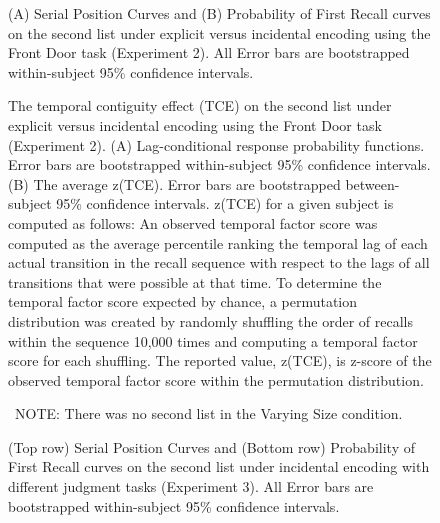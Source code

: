 \documentclass[man,natbib,floatsintext]{apa6} %
\begin{document}
\newcommand\spcpaneltext{All Error bars are bootstrapped within-subject 95\% confidence intervals.}


\newcommand\paneltext{(A) Lag-conditional response probability functions. Error bars are bootstrapped within-subject 95\% confidence intervals. (B) The average z(TCE).  Error bars are bootstrapped between-subject 95\% confidence intervals. z(TCE) for a given subject is computed as follows: An observed temporal factor score was computed as the average percentile ranking the temporal lag of each actual transition in the recall sequence with respect to the lags of all transitions that were possible at that time. To determine the temporal factor score expected by chance, a permutation distribution was created by randomly shuffling the order of recalls within the sequence 10,000 times and computing a temporal factor score for each shuffling. The reported value, z(TCE), is z-score of the observed temporal factor score within the permutation distribution.}

\begin{figure}
\caption{(A) Serial Position Curves and (B) Probability of First Recall curves on the second list under explicit versus incidental encoding using the Front Door task (Experiment 2). \spcpaneltext}
\label{e2_l2_spc}
\end{figure}


\begin{figure}%
\caption{The temporal contiguity effect (TCE) on the second list under explicit versus incidental encoding using the Front Door task (Experiment 2). \paneltext}
\label{e2_l2_crp}
\end{figure}



\begin{figure}
\caption{(Top row) Serial Position Curves and (Bottom row) Probability of First Recall curves on the second list under incidental encoding with different judgment tasks (Experiment 3). \spcpaneltext}~NOTE: There was no second list in the Varying Size condition.
\label{e3_l2_spc}
\end{figure}
\end{document}
